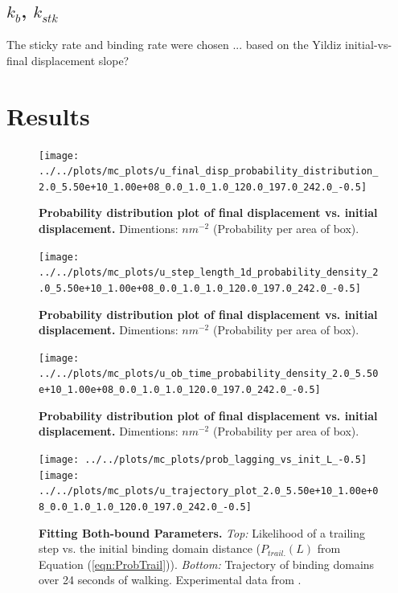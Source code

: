 \documentclass[9pt,twocolumn,twoside]{article}
\begin{document}
\subsection*{$k_b$, $k_{stk}$}
The sticky rate and binding rate were chosen ... based on the Yildiz initial-vs-final displacement slope?


\section{Results}

\begin{figure}[tbhp]
\centering
\texttt{[image: ../../plots/mc\_plots/u\_final\_disp\_probability\_distribution\_2.0\_5.50e+10\_1.00e+08\_0.0\_1.0\_1.0\_120.0\_197.0\_242.0\_-0.5]}
\caption{\textbf{Probability distribution plot of final displacement vs. initial displacement.} Dimentions: $nm^{-2}$ (Probability per area of box).}
\label{fig:final_disp_prob}
\end{figure}

\begin{figure}[tbhp]
\centering
\texttt{[image: ../../plots/mc\_plots/u\_step\_length\_1d\_probability\_density\_2.0\_5.50e+10\_1.00e+08\_0.0\_1.0\_1.0\_120.0\_197.0\_242.0\_-0.5]}
\caption{\textbf{Probability distribution plot of final displacement vs. initial displacement.} Dimentions: $nm^{-2}$ (Probability per area of box).}
\label{fig:final_disp_prob}
\end{figure}



\begin{figure}[tbhp]
\centering
\texttt{[image: ../../plots/mc\_plots/u\_ob\_time\_probability\_density\_2.0\_5.50e+10\_1.00e+08\_0.0\_1.0\_1.0\_120.0\_197.0\_242.0\_-0.5]}
\caption{\textbf{Probability distribution plot of final displacement vs. initial displacement.} Dimentions: $nm^{-2}$ (Probability per area of box).}
\label{fig:final_disp_prob}
\end{figure}


\begin{figure}[tbhp]
	\centering
	\texttt{[image: ../../plots/mc\_plots/prob\_lagging\_vs\_init\_L\_-0.5]}
	\texttt{[image: ../../plots/mc\_plots/u\_trajectory\_plot\_2.0\_5.50e+10\_1.00e+08\_0.0\_1.0\_1.0\_120.0\_197.0\_242.0\_-0.5]}
	\caption[Fitting Both-bound Parameters]{\textbf{Fitting Both-bound Parameters.} \textit{Top: }Likelihood of a trailing step vs. the initial binding domain distance ($P_{trail.}(L)$ from Equation (\ref{eqn:ProbTrail})). \textit{Bottom: }Trajectory of binding domains over 24 seconds of walking. Experimental data from \cite{Dewitt2012}.}
	\label{fig:BBPlots}
\end{figure}
\end{document}
